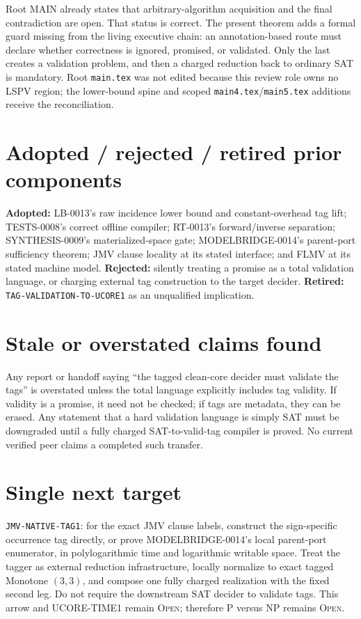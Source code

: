 \documentclass[11pt]{article}
\newcommand{\status}[1]{\textsc{#1}}
\begin{document}
Root MAIN already states that arbitrary-algorithm acquisition and the final
contradiction are open.  That status is correct.  The present theorem adds a
formal guard missing from the living executive chain: an annotation-based
route must declare whether correctness is ignored, promised, or validated.
Only the last creates a validation problem, and then a charged reduction back
to ordinary SAT is mandatory.  Root \texttt{main.tex} was not edited because
this review role owns no LSPV region; the lower-bound spine and scoped
\texttt{main4.tex}/\texttt{main5.tex} additions receive the reconciliation.

\section{Adopted / rejected / retired prior components}

\textbf{Adopted:} LB-0013's raw incidence lower bound and constant-overhead
tag lift; TESTS-0008's correct offline compiler; RT-0013's forward/inverse
separation; SYNTHESIS-0009's materialized-space gate; MODELBRIDGE-0014's
parent-port sufficiency theorem; JMV clause locality at its stated interface;
and FLMV at its stated machine model.  \textbf{Rejected:} silently treating a
promise as a total validation language, or charging external tag construction
to the target decider.  \textbf{Retired:}
\texttt{TAG-VALIDATION-TO-UCORE1} as an unqualified implication.

\section{Stale or overstated claims found}

Any report or handoff saying ``the tagged clean-core decider must validate
the tags'' is overstated unless the total language explicitly includes tag
validity.  If validity is a promise, it need not be checked; if tags are
metadata, they can be erased.  Any statement that a hard validation language
is simply SAT must be downgraded until a fully charged SAT-to-valid-tag
compiler is proved.  No current verified peer claims a completed such
transfer.

\section*{Single next target}

\texttt{JMV-NATIVE-TAG1}: for the exact JMV clause labels, construct the
sign-specific occurrence tag directly, or prove MODELBRIDGE-0014's local
parent-port enumerator, in polylogarithmic time and logarithmic writable
space.  Treat the tagger as external reduction infrastructure, locally
normalize to exact tagged Monotone $(3,3)$, and compose one fully charged
realization with the fixed second leg.  Do not require the downstream SAT
decider to validate tags.  This arrow and UCORE-TIME1 remain \status{Open};
therefore P versus NP remains \status{Open}.

\end{document}
